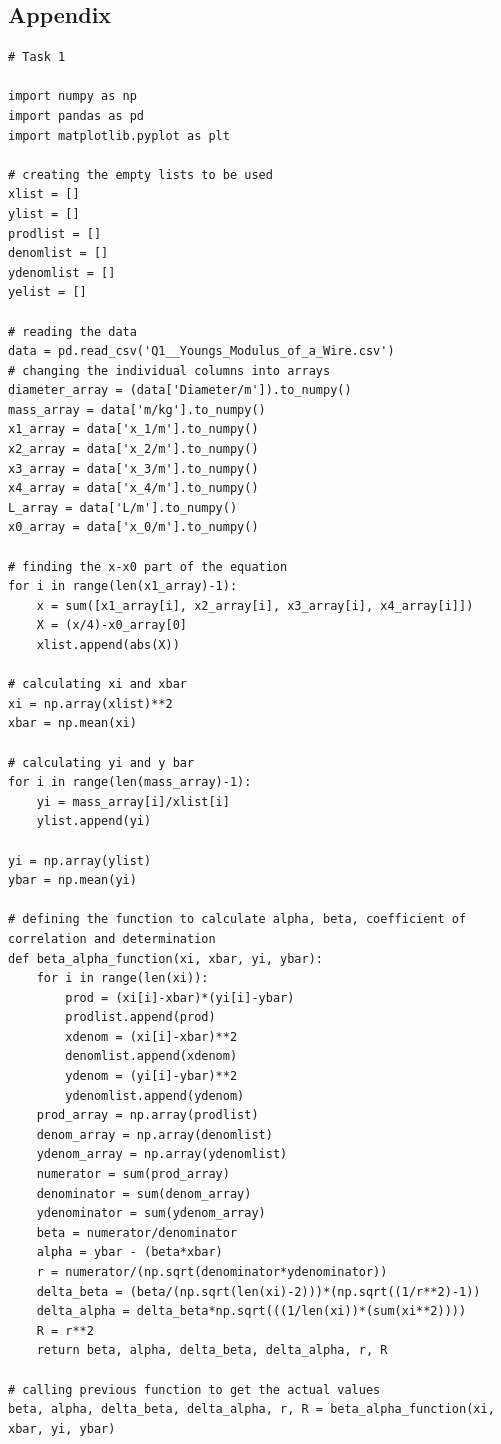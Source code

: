 \documentclass[12pt, a4paper]{article}
\begin{document}
\subsection{Appendix}
\begin{verbatim}
# Task 1

import numpy as np
import pandas as pd
import matplotlib.pyplot as plt

# creating the empty lists to be used
xlist = []
ylist = []
prodlist = []
denomlist = []
ydenomlist = []
yelist = []

# reading the data
data = pd.read_csv('Q1__Youngs_Modulus_of_a_Wire.csv')
# changing the individual columns into arrays
diameter_array = (data['Diameter/m']).to_numpy()
mass_array = data['m/kg'].to_numpy()
x1_array = data['x_1/m'].to_numpy()
x2_array = data['x_2/m'].to_numpy()
x3_array = data['x_3/m'].to_numpy()
x4_array = data['x_4/m'].to_numpy()
L_array = data['L/m'].to_numpy()
x0_array = data['x_0/m'].to_numpy()

# finding the x-x0 part of the equation
for i in range(len(x1_array)-1):
    x = sum([x1_array[i], x2_array[i], x3_array[i], x4_array[i]])
    X = (x/4)-x0_array[0]
    xlist.append(abs(X))

# calculating xi and xbar
xi = np.array(xlist)**2
xbar = np.mean(xi)

# calculating yi and y bar
for i in range(len(mass_array)-1):
    yi = mass_array[i]/xlist[i]
    ylist.append(yi)

yi = np.array(ylist)
ybar = np.mean(yi)

# defining the function to calculate alpha, beta, coefficient of correlation and determination
def beta_alpha_function(xi, xbar, yi, ybar):
    for i in range(len(xi)):
        prod = (xi[i]-xbar)*(yi[i]-ybar)
        prodlist.append(prod)
        xdenom = (xi[i]-xbar)**2
        denomlist.append(xdenom)
        ydenom = (yi[i]-ybar)**2
        ydenomlist.append(ydenom)
    prod_array = np.array(prodlist)
    denom_array = np.array(denomlist)
    ydenom_array = np.array(ydenomlist)
    numerator = sum(prod_array)
    denominator = sum(denom_array)
    ydenominator = sum(ydenom_array)
    beta = numerator/denominator
    alpha = ybar - (beta*xbar)
    r = numerator/(np.sqrt(denominator*ydenominator))
    delta_beta = (beta/(np.sqrt(len(xi)-2)))*(np.sqrt((1/r**2)-1))
    delta_alpha = delta_beta*np.sqrt(((1/len(xi))*(sum(xi**2))))
    R = r**2
    return beta, alpha, delta_beta, delta_alpha, r, R

# calling previous function to get the actual values
beta, alpha, delta_beta, delta_alpha, r, R = beta_alpha_function(xi, xbar, yi, ybar)


\end{verbatim}
\end{document}
